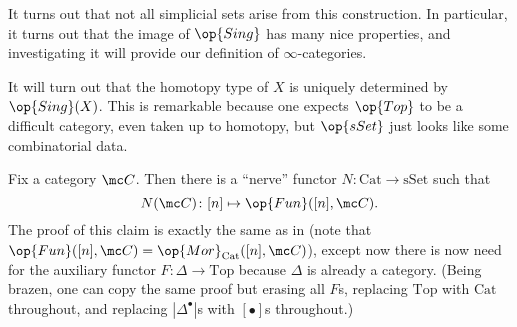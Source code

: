 \documentclass[../notes.tex]{subfiles}
\begin{document}
\begin{remark}
	It turns out that not all simplicial sets arise from this construction. In particular, it turns out that the image of $\op{Sing}$ has many nice properties, and investigating it will provide our definition of $\infty$-categories.
\end{remark}
\begin{remark}
	It will turn out that the homotopy type of $X$ is uniquely determined by $\op{Sing}(X)$. This is remarkable because one expects $\op{Top}$ to be a difficult category, even taken up to homotopy, but $\op{sSet}$ just looks like some combinatorial data.
\end{remark}
\begin{example}[nerve]
	Fix a category $\mc C$. Then there is a ``nerve'' functor $N\colon\mathrm{Cat}\to\mathrm{sSet}$ such that
	\[N(\mc C)\colon[n]\mapsto\op{Fun}([n],\mc C).\]
	The proof of this claim is exactly the same as in  (note that $\op{Fun}([n],\mc C)=\op{Mor}_{\mathrm{Cat}}([n],\mc C)$), except now there is now need for the auxiliary functor $F\colon\Delta\to\mathrm{Top}$ because $\Delta$ is already a category. (Being brazen, one can copy the same proof but erasing all $F$s, replacing $\mathrm{Top}$ with $\mathrm{Cat}$ throughout, and replacing $\left|\Delta^\bullet\right|$s with $[\bullet]$s throughout.)
\end{example}
\end{document}
